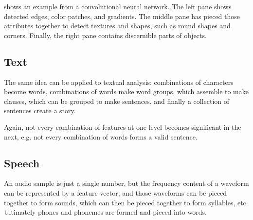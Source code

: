  shows an example from a convolutional neural network.
The left pane shows detected edges, color patches, and gradients.
The middle pane has pieced those attributes together to detect textures and shapes, such as round shapes and corners.
Finally, the right pane contains discernible parts of objects.

\subsection{Text}

The same idea can be applied to textual analysis: combinations of characters become words, combinations of words make word groups, which assemble to make clauses, which can be grouped to make sentences, and finally a collection of sentences create a story.

Again, not every combination of features at one level becomes significant in the next, e.g. not every combination of words forms a valid sentence.

\subsection{Speech}

An audio sample is just a single number, but the frequency content of a waveform can be represented by a feature vector, and those waveforms can be pieced together to form sounds, which can then be pieced together to form syllables, etc.
Ultimately phones and phonemes are formed and pieced into words.
